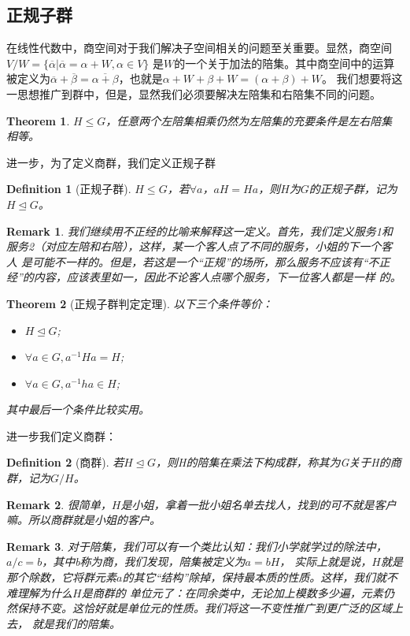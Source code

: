 \documentclass[12pt,a4paper,UTF8]{ctexbook}
\theoremstyle{plain}
\newtheorem{theorem}{\indent Theorem}[section]
\newtheorem{definition}{\indent Definition}[section]
\newtheorem{remark}{\indent Remark}[section]
\begin{document}
\subsection{正规子群}
在线性代数中，商空间对于我们解决子空间相关的问题至关重要。显然，商空间$V/W = \{\overline\alpha|\overline\alpha = \alpha + W, \alpha\in V\}$
是$W$的一个关于加法的陪集。其中商空间中的运算被定义为$\overline{\alpha} + \overline{\beta} = \overline{\alpha + \beta}$，也就是$\alpha + W + \beta + W = (\alpha + \beta) + W$。
我们想要将这一思想推广到群中，但是，显然我们必须要解决左陪集和右陪集不同的问题。
\begin{theorem}
    $H\leq G$，任意两个左陪集相乘仍然为左陪集的充要条件是左右陪集相等。
\end{theorem}
进一步，为了定义商群，我们定义正规子群
\begin{definition}[正规子群]
    $H\leq G$，若$\forall a$，$aH = Ha$，则$H$为$G$的正规子群，记为$H\trianglelefteq G$。
\end{definition}
\begin{remark}
    我们继续用不正经的比喻来解释这一定义。首先，我们定义服务1和服务2（对应左陪和右陪），这样，某一个客人点了不同的服务，小姐的下一个客人
    是可能不一样的。但是，若这是一个“正规”的场所，那么服务不应该有“不正经”的内容，应该表里如一，因此不论客人点哪个服务，下一位客人都是一样
    的。
\end{remark}
\begin{theorem}[正规子群判定定理]
    以下三个条件等价：
    \begin{itemize}
        \item $H\trianglelefteq G$;
        \item $\forall a\in G,a^{-1}H a = H$;
        \item $\forall a\in G,a^{-1}h a \in H$;
    \end{itemize}
    其中最后一个条件比较实用。
\end{theorem}
进一步我们定义商群：
\begin{definition}[商群]
    若$H\trianglelefteq G$，则H的陪集在乘法下构成群，称其为G关于H的商群，记为$G/H$。
\end{definition}
\begin{remark}
很简单，$H$是小姐，拿着一批小姐名单去找人，找到的可不就是客户嘛。所以商群就是小姐的客户。
\end{remark}
\begin{remark}
对于陪集，我们可以有一个类比认知：我们小学就学过的除法中，$a/c = b$，其中b称为商，我们发现，陪集被定义为$a = bH$，
实际上就是说，$H$就是那个除数，它将群元素$a$的其它“结构”除掉，保持最本质的性质。这样，我们就不难理解为什么$H$是商群的
单位元了：在同余类中，无论加上模数多少遍，元素仍然保持不变。这恰好就是单位元的性质。我们将这一不变性推广到更广泛的区域上去，
就是我们的陪集。
\end{remark}
\end{document}
